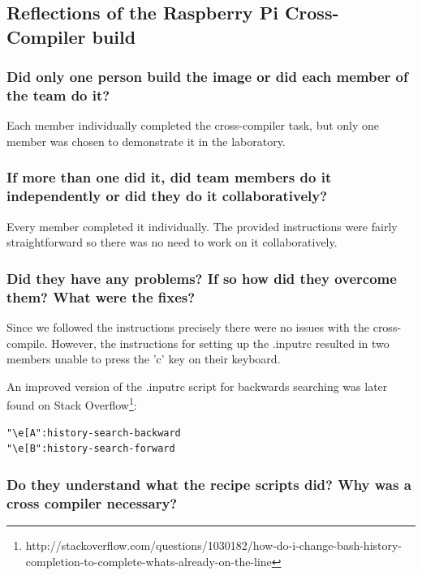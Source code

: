 \documentclass[11pt,a4paper,titlepage]{report}
\begin{document}
\begin{appendices}
\chapter{Reflections of the Raspberry Pi Cross-Compiler build}

\subsection*{Did only one person build the image or did each member of the team do it?}

Each member individually completed the cross-compiler task, but only one member was chosen to demonstrate it in the laboratory.

\subsection*{If more than one did it, did team members do it independently or did they do it 
collaboratively?}

Every member completed it individually. The provided instructions were fairly straightforward so there was no need to work on it collaboratively.

\subsection*{Did they have any problems? If so how did they overcome them? What were 
the fixes?}

Since we followed the instructions precisely there were no issues with the cross-compile. However, the instructions for setting up the .inputrc resulted in two members unable to press the 'c' key on their keyboard.

An improved version of the .inputrc script for backwards searching was later found on Stack Overflow\footnote{http://stackoverflow.com/questions/1030182/how-do-i-change-bash-history-completion-to-complete-whats-already-on-the-line}:

\begin{lstlisting}[frame=single]
"\e[A":history-search-backward
"\e[B":history-search-forward
\end{lstlisting}

\subsection*{Do they understand what the recipe scripts did? Why was a cross compiler 
necessary?}


\end{appendices}
\end{document}
